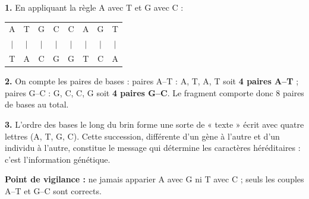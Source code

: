 \documentclass[11pt]{article}
\begin{document}
\begin{corrige}
\textbf{1.} En appliquant la règle A avec T et G avec C :
\begin{center}
\begin{tabular}{cccccccc}
A & T & G & C & C & A & G & T \\
$\vert$ & $\vert$ & $\vert$ & $\vert$ & $\vert$ & $\vert$ & $\vert$ & $\vert$ \\
T & A & C & G & G & T & C & A \\
\end{tabular}
\end{center}

\textbf{2.} On compte les paires de bases : paires A--T : A, T, A, T soit \textbf{4 paires A--T} ; paires G--C : G, C, C, G soit \textbf{4 paires G--C}. Le fragment comporte donc 8 paires de bases au total.

\textbf{3.} L'ordre des bases le long du brin forme une sorte de « texte » écrit avec quatre lettres (A, T, G, C). Cette succession, différente d'un gène à l'autre et d'un individu à l'autre, constitue le message qui détermine les caractères héréditaires : c'est l'information génétique.

\textbf{Point de vigilance :} ne jamais apparier A avec G ni T avec C ; seuls les couples A--T et G--C sont corrects.
\end{corrige}
\end{document}

